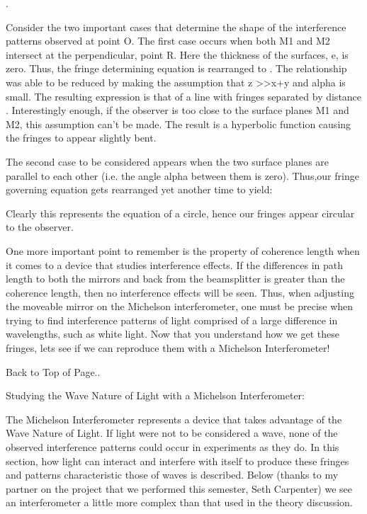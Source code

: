  . 

    Consider the two important cases that determine the shape of the interference patterns observed at point O.  The first case occurs when both M1 and M2 intersect at the perpendicular, point R.  Here the thickness of the surfaces, e, is zero.  Thus,  the  fringe determining equation is rearranged to .  The relationship was able to be reduced by making the assumption that z >>x+y and alpha is small. The resulting expression is that of a line with fringes separated by distance .   Interestingly enough, if the observer is too close to the surface planes M1 and M2, this assumption can't be made.  The result is a hyperbolic function causing the fringes to appear slightly bent. 

    The second case to be considered appears when the two surface planes are parallel to each other (i.e. the angle alpha between them is zero).   Thus,our fringe governing equation gets rearranged yet another time to yield:

 

Clearly this represents the equation of a circle, hence our fringes appear circular to the observer.

    One more important point to remember is the property of coherence length when it comes to a device that studies interference effects.  If the differences in path length to both the mirrors and back from the beamsplitter  is greater than the coherence length, then no interference effects will be seen.  Thus, when adjusting the moveable mirror on the Michelson interferometer, one must be precise when trying to find interference patterns of light comprised of a large difference in wavelengths, such as white light. Now that you understand how we get these fringes, lets see if we can reproduce them with a Michelson Interferometer!

Back to Top of Page..

Studying the Wave Nature of Light with a Michelson Interferometer:

    The Michelson Interferometer represents a device that takes advantage of the Wave Nature of Light.  If light were not to be considered a wave, none of the observed interference patterns could occur in experiments as they do.  In this section,  how light can interact and interfere with itself to produce these fringes and patterns characteristic those of waves is described.  Below (thanks to my partner on the project that we performed this semester, Seth Carpenter) we see an interferometer a little more complex than that used in the theory discussion.



